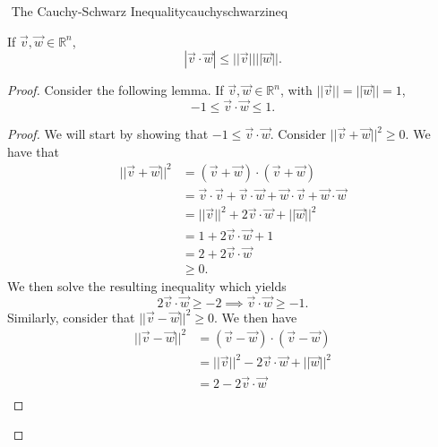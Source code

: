         \begin{theorem}{\Stop\,\,The Cauchy-Schwarz Inequality}{cauchyschwarzineq}

            If \(\vec{v},\vec{w}\in\mathbb{R}^n\), 
            \begin{equation*}
                |\vec{v}\cdot\vec{w}|\leq||\vec{v}||||\vec{w}||.
            \end{equation*}
            \begin{proof}
            
                Consider the following lemma. If \(\vec{v},\vec{w}\in\mathbb{R}^n\),
                with \(||\vec{v}||=||\vec{w}||=1\), 
                \begin{equation*}
                    -1\leq\vec{v}\cdot\vec{w}\leq 1.
                \end{equation*}
                \begin{proof}
                    We will start by showing that \(-1\leq\vec{v}\cdot\vec{w}\). Consider \(||\vec{v}+\vec{w}||^2\geq0\). We have that 
                    \begin{align*}
                        ||\vec{v}+\vec{w}||^2&=(\vec{v}+\vec{w})\cdot(\vec{v}+\vec{w}) \\
                        &=\vec{v}\cdot\vec{v}+\vec{v}\cdot\vec{w}+\vec{w}\cdot\vec{v}+\vec{w}\cdot\vec{w} \\
                        &=||\vec{v}||^2+2\vec{v}\cdot\vec{w}+||\vec{w}||^2 \\
                        &=1+2\vec{v}\cdot\vec{w}+1 \\
                        &=2+2\vec{v}\cdot\vec{w} \\
                        &\geq 0.
                    \end{align*}
                    We then solve the resulting inequality which yields
                    \begin{equation*}
                        2\vec{v}\cdot\vec{w}\geq-2 \implies \vec{v}\cdot\vec{w}\geq -1.
                    \end{equation*}
                    Similarly, consider that \(||\vec{v}-\vec{w}||^2\geq0\). We then have
                    \begin{align*}
                        ||\vec{v}-\vec{w}||^2&=(\vec{v}-\vec{w})\cdot(\vec{v}-\vec{w}) \\
                        &=||\vec{v}||^2-2\vec{v}\cdot\vec{w}+||\vec{w}||^2 \\
                        &=2-2\vec{v}\cdot\vec{w} \\

\end{align*}
\end{proof}
\end{proof}
\end{theorem}
